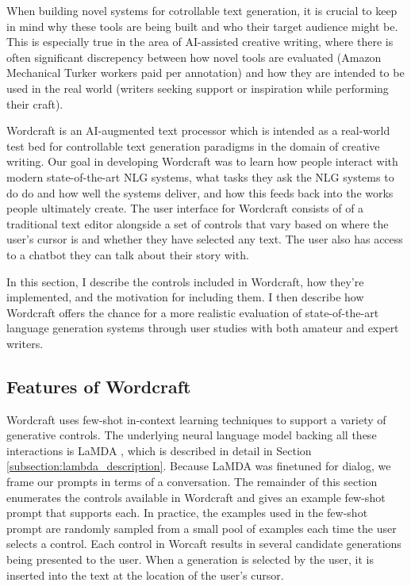 When building novel systems for cotrollable text generation, it is crucial to keep in mind why these tools are being built and who their target audience might be.
This is especially true in the area of AI-assisted creative writing, where there is often significant discrepency between how novel tools are evaluated (Amazon Mechanical Turker workers paid per annotation) and how they are intended to be used in the real world (writers seeking support or inspiration while performing their craft).

Wordcraft is an AI-augmented text processor which is intended as a real-world test bed for controllable text generation paradigms in the domain of creative writing.
Our goal in developing Wordcraft was to learn how people interact with modern state-of-the-art NLG systems, what tasks they ask the NLG systems to do do and how well the systems deliver, and how this feeds back into the works people ultimately create.
The user interface for Wordcraft consists of of a traditional text editor alongside a set of controls that vary based on where the user's cursor is and whether they have selected any text.
The user also has access to a chatbot they can talk about their story with.

In this section, I describe the controls included in  Wordcraft, how they're implemented, and the motivation for including them.
I then describe how Wordcraft offers the chance for a more realistic evaluation of state-of-the-art language generation systems through user studies with both amateur and expert writers.


\subsection{Features of Wordcraft}
\label{section:wordcraft_controls}
Wordcraft uses few-shot in-context learning techniques \cite{brown2020language} to support a variety of generative controls.
The underlying neural language model backing all these interactions is LaMDA \cite{thoppilan2022lamda}, which is described in detail in Section \ref{subsection:lambda_description}.
Because LaMDA was finetuned for dialog, we frame our prompts in terms of a conversation.
The remainder of this section enumerates the controls available in Wordcraft and gives an example few-shot prompt that supports each.
In practice, the examples used in the few-shot prompt are randomly sampled from a small pool of examples each time the user selects a control.
Each control in Worcaft results in several candidate generations being presented to the user.
When a generation is selected by the user, it is inserted into the text at the location of the user's cursor.


